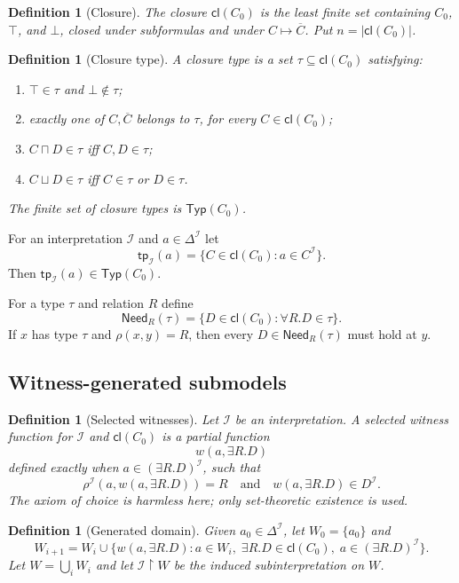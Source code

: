 \documentclass[11pt]{article}
\newtheorem{definition}[theorem]{Definition}
\newcommand{\Cl}{\mathsf{cl}}
\newcommand{\Typ}{\mathsf{Typ}}
\newcommand{\Need}{\mathsf{Need}}
\newcommand{\I}{\mathcal I}
\newcommand{\tp}{\mathsf{tp}}
\begin{document}
\begin{definition}[Closure]
The closure $\Cl(C_0)$ is the least finite set containing $C_0$, $\top$, and $\bot$, closed under subformulas and under $C\mapsto\overline C$.  Put $n=|\Cl(C_0)|$.
\end{definition}

\begin{definition}[Closure type]
A closure type is a set $\tau\subseteq\Cl(C_0)$ satisfying:
\begin{enumerate}[label=(T\arabic*)]
\item $\top\in\tau$ and $\bot\notin\tau$;
\item exactly one of $C,\overline C$ belongs to $\tau$, for every $C\in\Cl(C_0)$;
\item $C\sqcap D\in\tau$ iff $C,D\in\tau$;
\item $C\sqcup D\in\tau$ iff $C\in\tau$ or $D\in\tau$.
\end{enumerate}
The finite set of closure types is $\Typ(C_0)$.
\end{definition}

For an interpretation $\I$ and $a\in\Delta^\I$ let
\[
  \tp_\I(a)=\{C\in\Cl(C_0): a\in C^\I\}.
\]
Then $\tp_\I(a)\in\Typ(C_0)$.

For a type $\tau$ and relation $R$ define
\[
  \Need_R(\tau)=\{D\in\Cl(C_0): \forall R.D\in\tau\}.
\]
If $x$ has type $\tau$ and $\rho(x,y)=R$, then every $D\in\Need_R(\tau)$ must hold at $y$.

\subsection{Witness-generated submodels}

\begin{definition}[Selected witnesses]
Let $\I$ be an interpretation.  A selected witness function for $\I$ and $\Cl(C_0)$ is a partial function
\[
  w(a,\exists R.D)
\]
defined exactly when $a\in(\exists R.D)^\I$, such that
\[
  \rho^\I(a,w(a,\exists R.D))=R
  \quad\text{and}\quad
  w(a,\exists R.D)\in D^\I.
\]
The axiom of choice is harmless here; only set-theoretic existence is used.
\end{definition}

\begin{definition}[Generated domain]
Given $a_0\in\Delta^\I$, let $W_0=\{a_0\}$ and
\[
  W_{i+1}=W_i\cup\{w(a,\exists R.D):a\in W_i,\; \exists R.D\in\Cl(C_0),\; a\in(\exists R.D)^\I\}.
\]
Let $W=\bigcup_i W_i$ and let $\I\upharpoonright W$ be the induced subinterpretation on $W$.
\end{definition}
\end{document}
